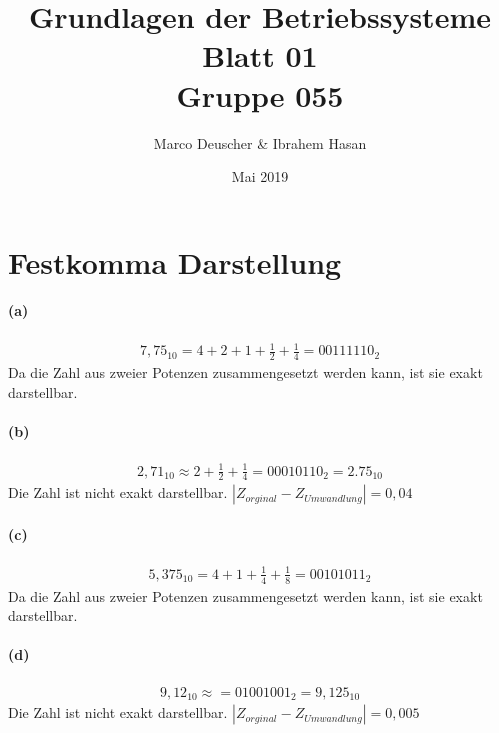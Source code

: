 \documentclass[a4paper]{article}
\title{Grundlagen der Betriebssysteme\\ Blatt 01 \\ Gruppe 055}
\author{Marco Deuscher & Ibrahem Hasan}
\date{Mai 2019}
\begin{document}
\maketitle

\section{Festkomma Darstellung}
\paragraph{(a)}
\begin{align*}
    7,75_{10}=4+2+1+\frac{1}{2}+\frac{1}{4}=00111110_2
\end{align*}
Da die Zahl aus zweier Potenzen zusammengesetzt werden kann, ist sie exakt darstellbar.


\paragraph{(b)}
\begin{align*}
    2,71_{10}\approx2+\frac{1}{2}+\frac{1}{4}=00010110_2=2.75_{10}
\end{align*}
Die Zahl ist nicht exakt darstellbar. $|Z_{orginal}-Z_{Umwandlung}|=0,04$


\paragraph{(c)}
\begin{align*}
    5,375_{10} = 4+1+\frac{1}{4}+\frac{1}{8}=00101011_2
\end{align*}
Da die Zahl aus zweier Potenzen zusammengesetzt werden kann, ist sie exakt darstellbar.

\paragraph{(d)}
\begin{align*}
    9,12_{10}\approx=01001001_2=9,125_{10}
\end{align*}
Die Zahl ist nicht exakt darstellbar. $|Z_{orginal}-Z_{Umwandlung}|=0,005$
\end{document}
